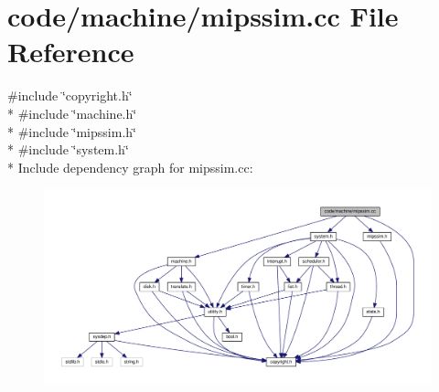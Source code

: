 \section{code/machine/mipssim.cc File Reference}
\label{mipssim_8cc}
{\ttfamily \#include \char`\"{}copyright.\+h\char`\"{}}\\*
{\ttfamily \#include \char`\"{}machine.\+h\char`\"{}}\\*
{\ttfamily \#include \char`\"{}mipssim.\+h\char`\"{}}\\*
{\ttfamily \#include \char`\"{}system.\+h\char`\"{}}\\*
Include dependency graph for mipssim.\+cc\+:
\nopagebreak
\begin{figure}[H]
\begin{center}
\leavevmode
\includegraphics[width=350pt]{mipssim_8cc__incl}
\end{center}
\end{figure}
